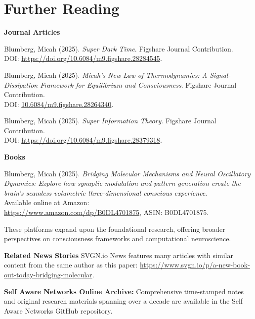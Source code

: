\setcounter{subsection}{0}
\renewcommand{\thesection}{}
\renewcommand{\thesubsection}{.\arabic{subsection}}
\section*{Further Reading}

\textbf{Journal Articles}

\noindent Blumberg, Micah (2025). \emph{Super Dark Time}. Figshare Journal Contribution.\\DOI: \href{https://doi.org/10.6084/m9.figshare.28284545}{https://doi.org/10.6084/m9.figshare.28284545}.

\medskip
\noindent Blumberg, Micah (2025). \emph{Micah's New Law of Thermodynamics: A Signal-Dissipation Framework for Equilibrium and Consciousness}. Figshare Journal Contribution.\\DOI: \href{https://doi.org/10.6084/m9.figshare.28264340}{10.6084/m9.figshare.28264340}.

\medskip
\noindent Blumberg, Micah (2025). \emph{Super Information Theory}. Figshare Journal Contribution.\\DOI: \href{https://doi.org/10.6084/m9.figshare.28379318}{https://doi.org/10.6084/m9.figshare.28379318}.

\medskip
\noindent \textbf{Books}

\noindent Blumberg, Micah (2025). \emph{Bridging Molecular Mechanisms and Neural Oscillatory Dynamics: Explore how synaptic modulation and pattern generation create the brain's seamless volumetric three-dimensional conscious experience}. \\Available online at Amazon:\\ \href{https://www.amazon.com/dp/B0DL4701875}{https://www.amazon.com/dp/B0DL4701875}, ASIN: B0DL4701875.

\medskip
\noindent These platforms expand upon the foundational research, offering broader perspectives on consciousness frameworks and computational neuroscience.

\medskip

\noindent \textbf{Related News Stories}
\noindent SVGN.io News features many articles with similar content from the same author as this paper: \href{https://www.svgn.io/p/a-new-book-out-today-bridging-molecular}{https://www.svgn.io/p/a-new-book-out-today-bridging-molecular}.

\medskip

\noindent \textbf{Self Aware Networks Online Archive:} Comprehensive time-stamped notes and original research materials spanning over a decade are available in the Self Aware Networks GitHub repository.

